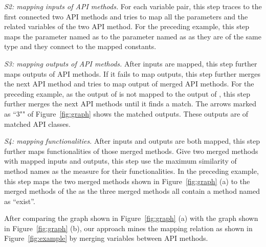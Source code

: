 \emph{S2: mapping inputs of API methods.} For each variable pair,
this step traces to the first connected two API methods and tries to
map all the parameters and the related variables of the two API
method. For the preceding example, this step maps the parameter
named as  to the parameter named as 
as they are of the same type and they connect to the mapped
constants.

\emph{S3: mapping outputs of API methods.} After inputs are mapped,
this step further maps outputs of API methods. If it fails to map
outputs, this step further merges the next API method and tries to
map output of merged API methods. For the preceding example, as the
output of  is not mapped to the output
of , this step further merges the next
API methods until it finds a match. The arrows marked as ``3"" of
Figure~\ref{fig:graph} shows the matched outputs. These outputs are
of matched API classes.

\emph{S4: mapping functionalities.} After inputs and outputs are
both mapped, this step further maps functionalities of those merged
methods. Give two merged methods with mapped inputs and outputs,
this step use the maximum similarity of method names as the measure
for their functionalities. In the preceding example, this step maps
the two merged methods shown in Figure~\ref{fig:graph} (a) to the
merged methods of the  as the three
merged methods all contain a method named as ``exist''.

After comparing the graph shown in Figure~\ref{fig:graph} (a) with
the graph shown in Figure~\ref{fig:graph} (b), our approach mines
the mapping relation as shown in Figure~\ref{fig:example} by merging
variables between API methods.
